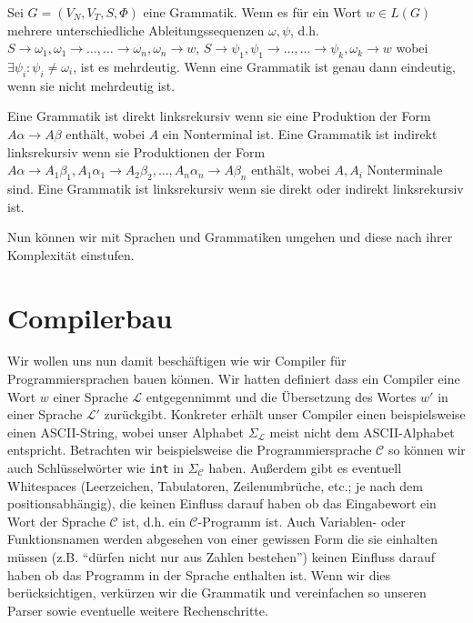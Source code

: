 \begin{defn}
Sei $G=(V_N,V_T,S,\Phi)$ eine Grammatik. Wenn es für ein Wort $w \in L(G)$ mehrere
unterschiedliche Ableitungssequenzen $\omega,\psi$, d.h. $S \to \omega_1, \omega_1 \to \ldots, \ldots \to \omega_n, \omega_n \to w$,
                                                         $S \to \psi_1, \psi_1 \to \ldots, \ldots \to \psi_k, \omega_k \to w$
wobei $\exists \psi_i : \psi_i \neq \omega_i$, ist es mehrdeutig. Wenn eine Grammatik ist genau dann eindeutig, wenn sie nicht mehrdeutig ist.
\end{defn}

\begin{defn}[Linksrekursiv]
Eine Grammatik ist direkt linksrekursiv wenn sie eine Produktion der Form $A\alpha \to A\beta$ enthält, wobei $A$ ein Nonterminal ist.
Eine Grammatik ist indirekt linksrekursiv wenn sie Produktionen der Form $A\alpha \to A_1\beta_1, A_1 \alpha_1 \to A_2\beta_2, \ldots, A_n \alpha_n \to A\beta_n$ enthält, wobei $A,A_i$ Nonterminale sind.
Eine Grammatik ist linksrekursiv wenn sie direkt oder indirekt linksrekursiv ist.
\end{defn}

Nun können wir mit Sprachen und Grammatiken umgehen und diese nach ihrer Komplexität einstufen.

\section{Compilerbau}
Wir wollen uns nun damit beschäftigen wie wir Compiler für Programmiersprachen bauen können.
Wir hatten definiert dass ein Compiler eine Wort $w$ einer Sprache $\mathcal{L}$ entgegennimmt und
die Übersetzung des Wortes $w'$ in einer Sprache $\mathcal{L}'$ zurückgibt.
Konkreter erhält unser Compiler einen beispielsweise einen ASCII-String, wobei unser Alphabet $\Sigma_\mathcal{L}$ meist
nicht dem ASCII-Alphabet entspricht. Betrachten wir beispielsweise die Programmiersprache $\mathcal{C}$ so können wir
auch Schlüsselwörter wie \verb|int| in $\Sigma_\mathcal{C}$ haben.
Außerdem gibt es eventuell Whitespaces (Leerzeichen, Tabulatoren, Zeilenumbrüche, etc.; je nach dem positionsabhängig), die keinen Einfluss darauf haben ob das
Eingabewort ein Wort der Sprache $\mathcal{C}$ ist, d.h. ein $\mathcal{C}$-Programm ist. Auch Variablen- oder Funktionsnamen werden abgesehen von einer
gewissen Form die sie einhalten müssen (z.B. ``dürfen nicht nur aus Zahlen bestehen'') keinen Einfluss darauf haben ob das Programm in der Sprache enthalten ist.
Wenn wir dies berücksichtigen, verkürzen wir die Grammatik und vereinfachen so unseren Parser sowie eventuelle weitere Rechenschritte.


